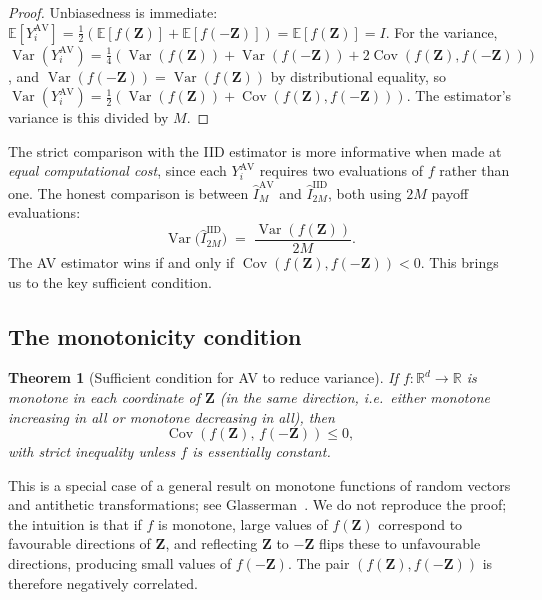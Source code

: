 \documentclass[11pt,a4paper]{article}
\theoremstyle{plain}
\newtheorem{theorem}{Theorem}[section]
\theoremstyle{definition}
\theoremstyle{remark}
\newcommand{\R}{\mathbb{R}}
\newcommand{\E}{\mathbb{E}}
\newcommand{\Var}{\operatorname{Var}}
\newcommand{\Cov}{\operatorname{Cov}}
\begin{document}
\begin{proof}
Unbiasedness is immediate: $\E[Y_i^{\mathrm{AV}}] = \tfrac{1}{2}(\E[f(\mathbf{Z})]
+ \E[f(-\mathbf{Z})]) = \E[f(\mathbf{Z})] = I$. For the variance,
$\Var(Y_i^{\mathrm{AV}}) = \tfrac{1}{4}(\Var(f(\mathbf{Z})) +
\Var(f(-\mathbf{Z})) + 2 \Cov(f(\mathbf{Z}), f(-\mathbf{Z})))$, and
$\Var(f(-\mathbf{Z})) = \Var(f(\mathbf{Z}))$ by distributional
equality, so $\Var(Y_i^{\mathrm{AV}}) = \tfrac{1}{2}(\Var(f(\mathbf{Z}))
+ \Cov(f(\mathbf{Z}), f(-\mathbf{Z})))$. The estimator's variance is
this divided by $M$.
\end{proof}

The strict comparison with the IID estimator is more informative when
made at \emph{equal computational cost}, since each $Y_i^{\mathrm{AV}}$
requires two evaluations of $f$ rather than one. The honest
comparison is between $\hat I_M^{\mathrm{AV}}$ and $\hat I_{2M}^{\mathrm{IID}}$,
both using $2M$ payoff evaluations:
\begin{equation}
\Var\bigl(\hat I_{2M}^{\mathrm{IID}}\bigr)
\;=\; \frac{\Var(f(\mathbf{Z}))}{2M}.
\end{equation}
The AV estimator wins if and only if $\Cov(f(\mathbf{Z}), f(-\mathbf{Z}))
< 0$. This brings us to the key sufficient condition.

\subsection{The monotonicity condition}

\begin{theorem}[Sufficient condition for AV to reduce variance]
\label{thm:av-monotone}
If $f : \R^d \to \R$ is monotone in each coordinate of $\mathbf{Z}$
(in the same direction, i.e.\ either monotone increasing in all or
monotone decreasing in all), then
\begin{equation}
\Cov(f(\mathbf{Z}),\, f(-\mathbf{Z})) \leq 0,
\end{equation}
with strict inequality unless $f$ is essentially constant.
\end{theorem}

This is a special case of a general result on monotone functions of
random vectors and antithetic transformations; see
Glasserman~\cite[Section~4.2]{Glasserman}. We do not reproduce the
proof; the intuition is that if $f$ is monotone, large values of
$f(\mathbf{Z})$ correspond to favourable directions of $\mathbf{Z}$,
and reflecting $\mathbf{Z}$ to $-\mathbf{Z}$ flips these to
unfavourable directions, producing small values of $f(-\mathbf{Z})$.
The pair $(f(\mathbf{Z}), f(-\mathbf{Z}))$ is therefore negatively
correlated.
\end{document}
